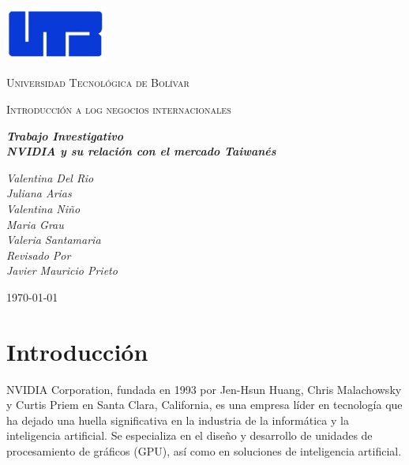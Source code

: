 \documentclass[letterpaper, 12pt]{article}
\begin{document}
\begin{titlepage}
      \centering
      \includegraphics[width=0.25\textwidth]{Images/Imagen1.jpg}\par\vspace{1cm}
      {\scshape\LARGE Universidad Tecnológica de Bolívar \par}
      \vspace{.5cm}

      {\scshape\Large Introducción a log negocios internacionales \par}
      \vspace{.2cm}

      \slshape {\Large \bfseries{}Trabajo Investigativo\\}
      \slshape {\small \bfseries{}NVIDIA y su relación con el mercado Taiwanés}
      \vspace{1cm}

      \slshape {\itshape{} Valentina Del Rio \\}
      \slshape {\itshape{} Juliana Arias \\}
      \slshape {\itshape{} Valentina Niño \\}
      \slshape {\itshape{} Maria Grau \\}
      \slshape {\itshape{} Valeria Santamaria \\}
      \vfill
      Revisado Por \\
      Javier Mauricio Prieto \\
      {\large \today\par}
\end{titlepage}


\nocite{*}

\section{Introducción}

NVIDIA Corporation, fundada en 1993 por Jen-Hsun Huang, Chris
Malachowsky y Curtis Priem en Santa Clara, California, es una
empresa líder en tecnología que ha dejado una huella
significativa en la industria de la informática y la
inteligencia artificial. Se especializa en el diseño y
desarrollo de unidades de procesamiento de gráficos (GPU),
así como en soluciones de inteligencia artificial.
\end{document}

